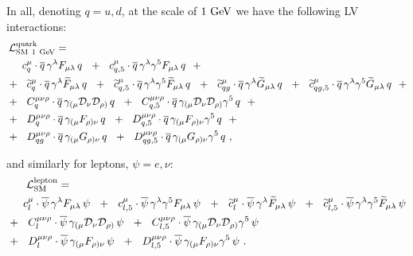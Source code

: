 \documentclass[12pt]{revtex4}
\newcommand{\wt}{\widetilde}
\newcommand{\ov}{\overline}
\newcommand{\md}{\mathcal{D}}
\newcommand{\GeV}{{\rm GeV}}
\begin{document}
	In all, denoting $ q = u, d $, at the scale of $ 1~\GeV $ we 
	have the following LV interactions:
\begin{align}
\nonumber
	\mathcal{L}_{\rm SM\ 1~GeV}^{\rm quark} = \hspace{-2.0cm}&
	\\
\nonumber
	&
	\phantom{+~~}
	c_{q}^\mu \cdot
	\ov{q}\, \gamma^\lambda F_{\mu\lambda}\, q 
	~~+~~
	c_{q,5}^\mu \cdot
	\ov{q}\, \gamma^\lambda \gamma^5 F_{\mu\lambda}\, q 
	~~+
	\\
\notag
	&
	+~~
	\wt{c}_{q}^\mu \cdot
	\ov{q}\, \gamma^\lambda \wt{F}_{\mu\lambda}\, q 
	~~+~~
	\wt{c}_{q,5}^\mu \cdot
	\ov{q}\, \gamma^\lambda\gamma^5 \wt{F}_{\mu\lambda}\, q 
	~~+~~
	\wt{c}_{qg}^\mu \cdot
	\ov{q}\, \gamma^\lambda \wt{G}_{\mu\lambda}\, q 
	~~+~~
	\wt{c}_{qg,5}^\mu \cdot
	\ov{q}\, \gamma^\lambda\gamma^5 \wt{G}_{\mu\lambda}\, q 
	~~+
	\\
\label{SM_quark_1GeV}
	&
	+~~
	C_q^{\mu\nu\rho} \cdot
	\ov{q}\, \gamma_{(\mu} \md_\nu \md_{\rho)}\, q
	~~+~~
	C_{q,5}^{\mu\nu\rho} \cdot
	\ov{q}\, \gamma_{(\mu} \md_\nu \md_{\rho)}\gamma^5\, q
	~~+
	\\
\nonumber
	&
	+~~
	D_{q}^{\mu\nu\rho} \cdot
	\ov{q}\, \gamma_{(\mu} F_{\rho)\nu}\, q
	~~+~~
	D_{q,5}^{\mu\nu\rho} \cdot
	\ov{q}\, \gamma_{(\mu} F_{\rho)\nu}\gamma^5\, q
	~~+
	\\
\nonumber
	&
	+~~
	D_{qg}^{\mu\nu\rho} \cdot
	\ov{q}\, \gamma_{(\mu} G_{\rho)\nu}\, q
	~~+~~
	D_{qg,5}^{\mu\nu\rho} \cdot
	\ov{q}\, \gamma_{(\mu} G_{\rho)\nu}\gamma^5\, q
	~,
\end{align}

	and similarly for leptons, $ \psi = e, \nu $:
\begin{align}
\nonumber
	\mathcal{L}_{\rm SM}^{\rm lepton} = \hspace{-2.0cm}&
	\\
\nonumber
	&
	\phantom{+~~}
	c_l^\mu \cdot
	\ov{\psi}\, \gamma^{\lambda} F_{\mu\lambda}\, \psi
	~~+~~
	c_{l,5}^\mu \cdot
	\ov{\psi}\, \gamma^{\lambda}\gamma^5 F_{\mu\lambda}\, \psi
	~~+~~
	\wt{c}_{l}^\mu \cdot
	\ov{\psi}\, \gamma^{\lambda} \wt{F}_{\mu\lambda}\, \psi
	~~+~~
	\wt{c}_{l,5}^\mu \cdot
	\ov{\psi}\, \gamma^{\lambda}\gamma^5 \wt{F}_{\mu\lambda}\, \psi
	\\
\nonumber
	&
	+~~
	C_l^{\mu\nu\rho} \cdot
	\ov{\psi}\, \gamma_{(\mu} \md_\nu \md_{\rho)}\, \psi
	~~+~~
	C_{l,5}^{\mu\nu\rho} \cdot
	\ov{\psi}\, \gamma_{(\mu} \md_\nu \md_{\rho)}\gamma^5\, \psi
	\\
\label{SM_lepton_1GeV}
	&
	+~~
	D_{l}^{\mu\nu\rho} \cdot
	\ov{\psi}\, \gamma_{(\mu} F_{\rho)\nu}\, \psi
	~~+~~
	D_{l,5}^{\mu\nu\rho} \cdot
	\ov{\psi}\, \gamma_{(\mu} F_{\rho)\nu}\gamma^5\, \psi
	~.
\end{align}
\end{document}

